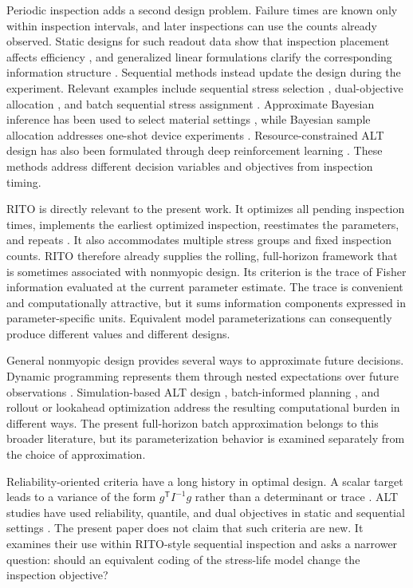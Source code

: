 \documentclass[a4paper,fleqn]{cas-sc}
\begin{document}
Periodic inspection adds a second design problem. Failure times are known only within inspection intervals, and later inspections can use the counts already observed. Static designs for such readout data show that inspection placement affects efficiency \citep{yangpan2013,hanbai2020,seo2022}, and generalized linear formulations clarify the corresponding information structure \citep{monroe2011}. Sequential methods instead update the design during the experiment. Relevant examples include sequential stress selection \citep{tangliu2010,lee2018}, dual-objective allocation \citep{lu2019}, and batch sequential stress assignment \citep{tung2021}. Approximate Bayesian inference has been used to select material settings \citep{chen2022}, while Bayesian sample allocation addresses one-shot device experiments \citep{kim2026}. Resource-constrained ALT design has also been formulated through deep reinforcement learning \citep{dasilva2026}. These methods address different decision variables and objectives from inspection timing.

RITO is directly relevant to the present work. It optimizes all pending inspection times, implements the earliest optimized inspection, reestimates the parameters, and repeats \citep{zhang2025rito}. It also accommodates multiple stress groups and fixed inspection counts. RITO therefore already supplies the rolling, full-horizon framework that is sometimes associated with nonmyopic design. Its criterion is the trace of Fisher information evaluated at the current parameter estimate. The trace is convenient and computationally attractive, but it sums information components expressed in parameter-specific units. Equivalent model parameterizations can consequently produce different values and different designs.

General nonmyopic design provides several ways to approximate future decisions. Dynamic programming represents them through nested expectations over future observations \citep{bertsekas2017}. Simulation-based ALT design \citep{erkanlisoyer2000,polsonsoyer2017}, batch-informed planning \citep{jiang2020}, and rollout or lookahead optimization \citep{lam2017,yue2020} address the resulting computational burden in different ways. The present full-horizon batch approximation belongs to this broader literature, but its parameterization behavior is examined separately from the choice of approximation.

Reliability-oriented criteria have a long history in optimal design. A scalar target leads to a variance of the form $g^{\mathsf T}I^{-1}g$ rather than a determinant or trace \citep{silvey1980}. ALT studies have used reliability, quantile, and dual objectives in static and sequential settings \citep{panyang2014,hong2015,lu2019}. The present paper does not claim that such criteria are new. It examines their use within RITO-style sequential inspection and asks a narrower question: should an equivalent coding of the stress-life model change the inspection objective?
\end{document}
